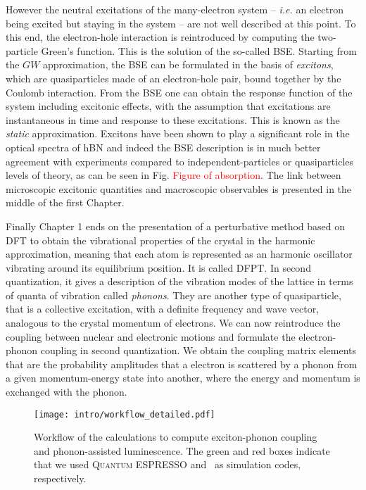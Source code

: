 However the neutral excitations of the many-electron system -- \textit{i.e.} an electron being excited but staying in the system -- are not well described at this point. To this end, the electron-hole interaction is reintroduced by computing the two-particle Green's function. This is the solution of the so-called \acrfull{BSE}. Starting from the $GW$ approximation, the \acrshort{BSE} can be formulated in the basis of \textit{excitons}, which are quasiparticles made of an electron-hole pair, bound together by the Coulomb interaction. From the \acrshort{BSE} one can obtain the response function of the system including excitonic effects, with the assumption that excitations are instantaneous in time and response to these excitations. This is known as the \textit{static} approximation. Excitons have been shown to play a significant role in the optical spectra of \acrshort{hBN} and indeed the \acrshort{BSE} description is in much better agreement with experiments compared to independent-particles or quasiparticles levels of theory, as can be seen in Fig. \textcolor{red}{Figure of absorption}. The link between microscopic excitonic quantities and macroscopic observables is presented in the middle of the first Chapter. 

Finally Chapter 1 ends on the presentation of a perturbative method based on \acrshort{DFT} to obtain the vibrational properties of the crystal in the harmonic approximation, meaning that each atom is represented as an harmonic oscillator vibrating around its equilibrium position. It is called \acrfull{DFPT}. In second quantization, it gives a description of the vibration modes of the lattice in terms of quanta of vibration called \textit{phonons}. They are another type of quasiparticle, that is a collective excitation, with a definite frequency and wave vector, analogous to the crystal momentum of electrons. We can now reintroduce the coupling between nuclear and electronic motions and formulate the electron-phonon coupling in second quantization. We obtain the coupling matrix elements that are the probability amplitudes that a electron is scattered by a phonon from a given momentum-energy state into another, where the energy and momentum is exchanged with the phonon.  
\begin{figure}[h!b]
	\vspace{0.2cm}
	\setcapindent{2em}
	\centering
	\texttt{[image: intro/workflow\_detailed.pdf]}
	\caption{Workflow of the calculations to compute exciton-phonon coupling and phonon-assisted luminescence. The green and red boxes indicate that we used \textsc{Quantum ESPRESSO} and \yambo~as simulation codes, respectively.}
	\label{fig:workflow}
\end{figure}

